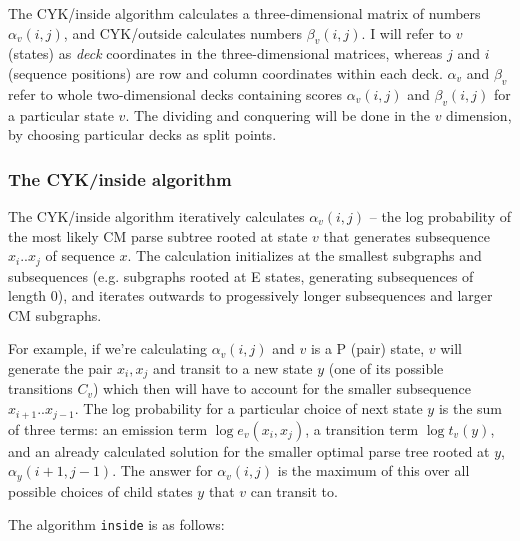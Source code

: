 \documentclass[11pt]{article}
\begin{document}
The CYK/inside algorithm calculates a three-dimensional matrix of
numbers $\alpha_v(i,j)$, and CYK/outside calculates numbers
$\beta_v(i,j)$. I will refer to $v$ (states) as \emph{deck}
coordinates in the three-dimensional matrices, whereas $j$ and $i$
(sequence positions) are row and column coordinates within each deck.
$\alpha_{v}$ and $\beta_{v}$ refer to whole two-dimensional decks
containing scores $\alpha_v(i,j)$ and $\beta_v(i,j)$ for a particular
state $v$. The dividing and conquering will be done in the $v$
dimension, by choosing particular decks as split points.

\subsubsection{The CYK/inside algorithm}

The CYK/inside algorithm iteratively calculates $\alpha_v(i,j)$ -- the
log probability of the most likely CM parse subtree rooted at state
$v$ that generates subsequence $x_i..x_j$ of sequence $x$. The
calculation initializes at the smallest subgraphs and subsequences
(e.g. subgraphs rooted at E states, generating subsequences of length
0), and iterates outwards to progessively longer subsequences and
larger CM subgraphs.

For example, if we're calculating $\alpha_v(i,j)$ and $v$ is a P
(pair) state, $v$ will generate the pair $x_i,x_j$ and transit to a
new state $y$ (one of its possible transitions $C_v$) which then will
have to account for the smaller subsequence $x_{i+1}..x_{j-1}$. The
log probability for a particular choice of next state $y$ is the sum
of three terms: an emission term $\log e_v(x_i,x_j)$, a transition
term $\log t_v(y)$, and an already calculated solution for the smaller
optimal parse tree rooted at $y$, $\alpha_y(i+1,j-1)$. The answer for
$\alpha_v(i,j)$ is the maximum of this over all possible choices of
child states $y$ that $v$ can transit to.

The algorithm \texttt{inside} is as follows:
\end{document}
